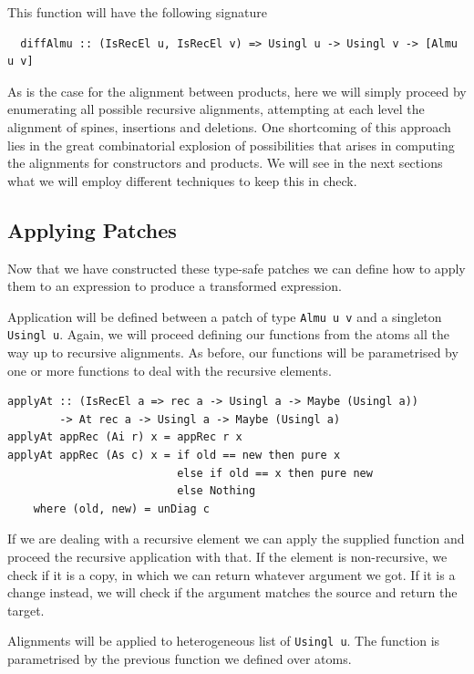 \documentclass[11pt, titlepage]{article}
\begin{document}
This function will have the following signature

\begin{verbatim}
  diffAlmu :: (IsRecEl u, IsRecEl v) => Usingl u -> Usingl v -> [Almu u v]
\end{verbatim}

As is the case for the alignment between products, here we will simply proceed by enumerating all possible recursive alignments, attempting at each level the alignment of spines, insertions and deletions.
One shortcoming of this approach lies in the great combinatorial explosion of possibilities that arises in computing the alignments for constructors and products. We will see in the next sections what we will employ different techniques to keep this in check. 

\subsection{Applying Patches}\label{app_patches}

Now that we have constructed these type-safe patches we can define how to apply 
them to an expression to produce a transformed expression.

Application will be defined between a patch of type \texttt{Almu u v} and a 
singleton \texttt{Usingl u}. 
Again, we will proceed defining our functions from the atoms all the way up to 
recursive alignments. As before, our functions will be parametrised by one or 
more functions to deal with the recursive elements. 

\begin{verbatim}
applyAt :: (IsRecEl a => rec a -> Usingl a -> Maybe (Usingl a))
        -> At rec a -> Usingl a -> Maybe (Usingl a)
applyAt appRec (Ai r) x = appRec r x
applyAt appRec (As c) x = if old == new then pure x
                          else if old == x then pure new
                          else Nothing
    where (old, new) = unDiag c  
\end{verbatim}

If we are dealing with a recursive element we can apply the supplied function 
and proceed the recursive application with that.
If the element is non-recursive, we check if it is a copy, in which we can 
return whatever argument we got. If it is a change instead, we will check if the 
argument matches the source and return the target.

Alignments will be applied to heterogeneous list of \texttt{Usingl u}. The function is parametrised by the previous function we defined over atoms.
\end{document}
